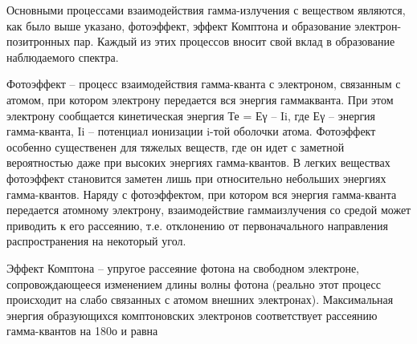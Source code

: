 Основными процессами взаимодействия гамма-излучения с веществом являются, как
было выше указано, фотоэффект, эффект Комптона и образование
электрон-позитронных пар. Каждый из этих процессов вносит свой вклад в
образование наблюдаемого спектра.

Фотоэффект – процесс взаимодействия гамма-кванта с электроном, связанным с
атомом, при котором электрону передается вся энергия гаммакванта. При этом
электрону сообщается кинетическая энергия Те = Еγ – Ii, где Еγ – энергия
гамма-кванта, Ii – потенциал ионизации i-той оболочки атома. Фотоэффект особенно
существенен для тяжелых веществ, где он идет с заметной вероятностью даже при
высоких энергиях гамма-квантов. В легких веществах фотоэффект становится заметен
лишь при относительно небольших энергиях гамма-квантов. Наряду с фотоэффектом,
при котором вся энергия гамма-кванта передается атомному электрону,
взаимодействие гаммаизлучения со средой может приводить к его рассеянию, т.е.
отклонению от первоначального направления распространения на некоторый угол.

Эффект Комптона – упругое рассеяние фотона на свободном электроне,
сопровождающееся изменением длины волны фотона (реально этот процесс происходит
на слабо связанных с атомом внешних электронах). Максимальная энергия
образующихся комптоновских электронов соответствует рассеянию гамма-квантов на
180о и равна
